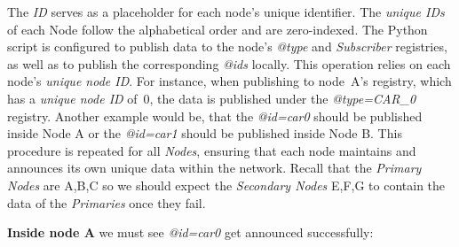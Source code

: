 \documentclass{article}
\begin{document}
The \textit{ID} serves as a placeholder for each node’s unique identifier. The \emph{unique IDs} of each Node follow the alphabetical order and are zero-indexed. The Python script is configured to publish data to the node’s \textit{@type} and \textit{Subscriber} registries, as well as to publish the corresponding \textit{@ids} locally. This operation relies on each node’s \emph{unique node ID}. For instance, when publishing to node~A’s registry, which has a \emph{unique node ID} of~0, the data is published under the \textit{@type=CAR\_0} registry. Another example would be, that the \textit{@id=car0} should be published inside Node A or the \textit{@id=car1} should be published inside Node B. This procedure is repeated for all \emph{Nodes}, ensuring that each node maintains and announces its own unique data within the network. Recall that the \emph{Primary Nodes} are A,B,C so we should expect the \emph{Secondary Nodes} E,F,G to contain the data of the \emph{Primaries} once they fail.

\textbf{Inside node A} we must see \textit{@id=car0} get announced successfully:
\end{document}
